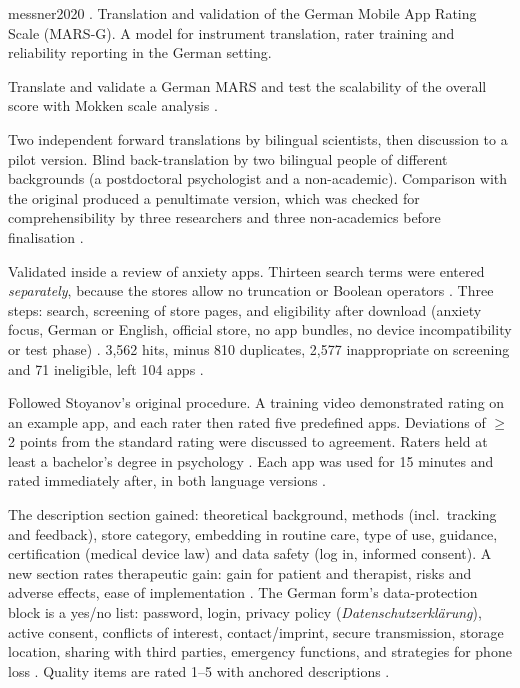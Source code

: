 \begin{papercard}{messner2020}
   . Translation and validation of the German Mobile App Rating Scale (MARS-G). A model for instrument translation, rater training and reliability reporting in the German setting.

 Translate and validate a German MARS and test the scalability of the overall score with Mokken scale analysis .

 Two independent forward translations by bilingual scientists, then discussion to a pilot version. Blind back-translation by two bilingual people of different backgrounds (a postdoctoral psychologist and a non-academic). Comparison with the original produced a penultimate version, which was checked for comprehensibility by three researchers and three non-academics before finalisation .

 Validated inside a review of anxiety apps. Thirteen search terms were entered \emph{separately}, because the stores allow no truncation or Boolean operators . Three steps: search, screening of store pages, and eligibility after download (anxiety focus, German or English, official store, no app bundles, no device incompatibility or test phase) . 3{,}562 hits, minus 810 duplicates, 2{,}577 inappropriate on screening and 71 ineligible, left 104 apps .

 Followed Stoyanov's original procedure. A training video demonstrated rating on an example app, and each rater then rated five predefined apps. Deviations of $\geq$2 points from the standard rating were discussed to agreement. Raters held at least a bachelor's degree in psychology . Each app was used for 15 minutes and rated immediately after, in both language versions .

 The description section gained: theoretical background, methods (incl.\ tracking and feedback), store category, embedding in routine care, type of use, guidance, certification (medical device law) and data safety (log in, informed consent). A new section rates therapeutic gain: gain for patient and therapist, risks and adverse effects, ease of implementation . The German form's data-protection block is a yes/no list: password, login, privacy policy (\emph{Datenschutzerklärung}), active consent, conflicts of interest, contact/imprint, secure transmission, storage location, sharing with third parties, emergency functions, and strategies for phone loss . Quality items are rated 1--5 with anchored descriptions .


\end{papercard}
